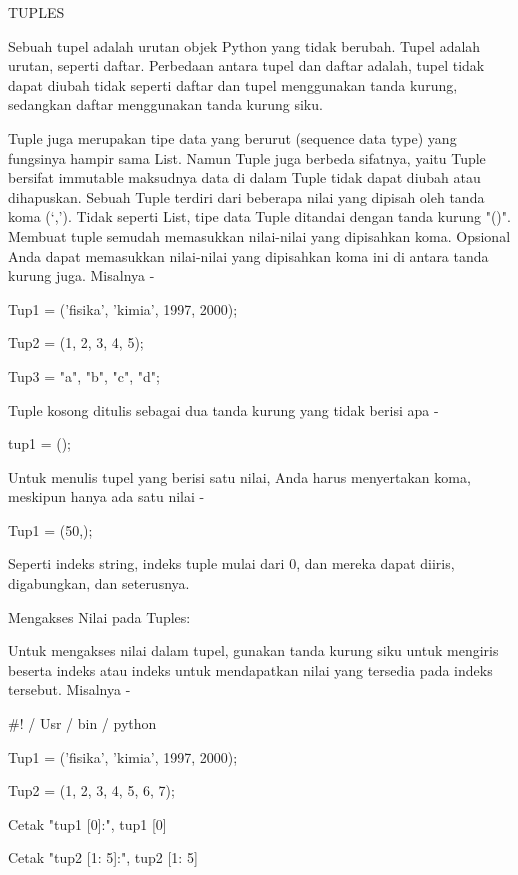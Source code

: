 

TUPLES \par
Sebuah tupel adalah urutan objek Python yang tidak berubah. Tupel adalah urutan, seperti daftar. Perbedaan antara tupel dan daftar adalah, tupel tidak dapat diubah tidak seperti daftar dan tupel menggunakan tanda kurung, sedangkan daftar menggunakan tanda kurung siku. \par
Tuple juga merupakan tipe data yang berurut (sequence data type) yang fungsinya hampir sama List. Namun Tuple juga berbeda sifatnya, yaitu Tuple bersifat immutable maksudnya data di dalam Tuple tidak dapat diubah atau dihapuskan. Sebuah Tuple terdiri dari beberapa nilai yang dipisah oleh tanda koma (‘,’). Tidak seperti List, tipe data Tuple ditandai dengan tanda kurung "()".
Membuat tuple semudah memasukkan nilai-nilai yang dipisahkan koma. Opsional Anda dapat memasukkan nilai-nilai yang dipisahkan koma ini di antara tanda kurung juga. Misalnya - \par
\vspace{12pt}
Tup1 = ('fisika', 'kimia', 1997, 2000); \par
Tup2 = (1, 2, 3, 4, 5); \par
Tup3 = "a", "b", "c", "d"; \par
Tuple kosong ditulis sebagai dua tanda kurung yang tidak berisi apa - \par
tup1 = (); \par
Untuk menulis tupel yang berisi satu nilai, Anda harus menyertakan koma, meskipun hanya ada satu nilai - \par
Tup1 = (50,); \par
Seperti indeks string, indeks tuple mulai dari 0, dan mereka dapat diiris, digabungkan, dan seterusnya. \par
Mengakses Nilai pada Tuples: \par
Untuk mengakses nilai dalam tupel, gunakan tanda kurung siku untuk mengiris beserta indeks atau indeks untuk mendapatkan nilai yang tersedia pada indeks tersebut. Misalnya - \par
 $  \#  $! / Usr / bin / python \par
\vspace{12pt}
Tup1 = ('fisika', 'kimia', 1997, 2000); \par
Tup2 = (1, 2, 3, 4, 5, 6, 7); \par
\vspace{12pt}
Cetak "tup1 [0]:", tup1 [0] \par
Cetak "tup2 [1: 5]:", tup2 [1: 5] \par
